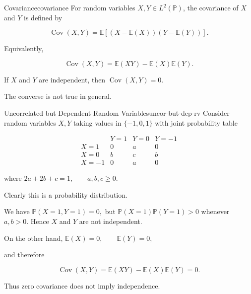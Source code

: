 
\begin{definition}{Covariance}{covariance}
For random variables $X,Y\in L^2(\mathbb{P})$, the covariance of
$X$ and $Y$ is defined by

\[
    \operatorname{Cov}(X,Y)
    =
    \mathbb{E}
    \left[
        (X-\mathbb{E}(X))(Y-\mathbb{E}(Y))
    \right].
\]

Equivalently,

\[
    \operatorname{Cov}(X,Y)
    =
    \mathbb{E}(XY)
    -
    \mathbb{E}(X)\mathbb{E}(Y).
\]
\end{definition}

\begin{remark}
If $X$ and $Y$ are independent, then
\(
    \operatorname{Cov}(X,Y)=0.
\)

The converse is not true in general.
\end{remark}


\begin{example}{Uncorrelated but Dependent Random Variables}{uncor-but-dep-rv}
Consider random variables $X,Y$ taking values in
$\{-1,0,1\}$ with joint probability table

\[
\begin{array}{c|ccc}
    & Y=1 & Y=0 & Y=-1 \\ \hline
X=1  & 0 & a & 0 \\
X=0  & b & c & b \\
X=-1 & 0 & a & 0
\end{array}
\]

where
\(
    2a+2b+c=1,
    \qquad
    a,b,c\geq 0.
\)

Clearly this is a probability distribution.

We have
\(
    \mathbb{P}(X=1,Y=1)=0,
\)
but
\(
    \mathbb{P}(X=1)\mathbb{P}(Y=1)>0
\)
whenever $a,b>0$. Hence $X$ and $Y$ are not independent.

On the other hand,
\(
    \mathbb{E}(X)=0,
    \qquad
    \mathbb{E}(Y)=0,
\)

and therefore

\[
    \operatorname{Cov}(X,Y)
    =
    \mathbb{E}(XY)
    -
    \mathbb{E}(X)\mathbb{E}(Y)
    =
    0.
\]

Thus zero covariance does not imply independence.
\end{example}

